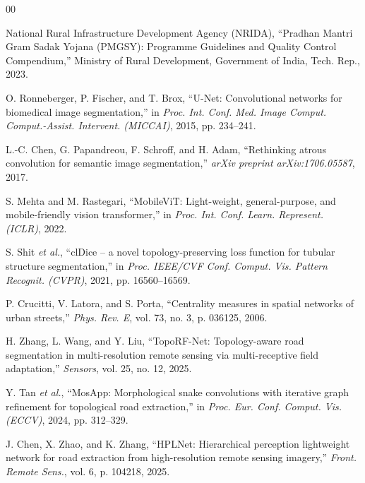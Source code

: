 \documentclass[conference]{IEEEtran}
\begin{document}
\begin{thebibliography}{00}

 National Rural Infrastructure Development Agency (NRIDA), ``Pradhan Mantri Gram Sadak Yojana (PMGSY): Programme Guidelines and Quality Control Compendium,'' Ministry of Rural Development, Government of India, Tech. Rep., 2023.

 O. Ronneberger, P. Fischer, and T. Brox, ``U-Net: Convolutional networks for biomedical image segmentation,'' in \textit{Proc. Int. Conf. Med. Image Comput. Comput.-Assist. Intervent. (MICCAI)}, 2015, pp. 234--241.

 L.-C. Chen, G. Papandreou, F. Schroff, and H. Adam, ``Rethinking atrous convolution for semantic image segmentation,'' \textit{arXiv preprint arXiv:1706.05587}, 2017.

 S. Mehta and M. Rastegari, ``MobileViT: Light-weight, general-purpose, and mobile-friendly vision transformer,'' in \textit{Proc. Int. Conf. Learn. Represent. (ICLR)}, 2022.

 S. Shit \textit{et al.}, ``clDice -- a novel topology-preserving loss function for tubular structure segmentation,'' in \textit{Proc. IEEE/CVF Conf. Comput. Vis. Pattern Recognit. (CVPR)}, 2021, pp. 16560--16569.

 P. Crucitti, V. Latora, and S. Porta, ``Centrality measures in spatial networks of urban streets,'' \textit{Phys. Rev. E}, vol. 73, no. 3, p. 036125, 2006.

 H. Zhang, L. Wang, and Y. Liu, ``TopoRF-Net: Topology-aware road segmentation in multi-resolution remote sensing via multi-receptive field adaptation,'' \textit{Sensors}, vol. 25, no. 12, 2025.

 Y. Tan \textit{et al.}, ``MosApp: Morphological snake convolutions with iterative graph refinement for topological road extraction,'' in \textit{Proc. Eur. Conf. Comput. Vis. (ECCV)}, 2024, pp. 312--329.

 J. Chen, X. Zhao, and K. Zhang, ``HPLNet: Hierarchical perception lightweight network for road extraction from high-resolution remote sensing imagery,'' \textit{Front. Remote Sens.}, vol. 6, p. 104218, 2025.


\end{thebibliography}
\end{document}
